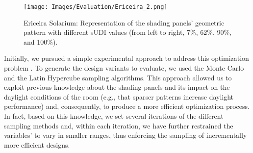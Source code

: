 
\begin{figure}[htpb]
	\centering
	\texttt{[image: Images/Evaluation/Ericeira\_2.png]}
	\caption{Ericeira Solarium: Representation of the shading panels’ geometric pattern with different sUDI values (from left to right, 7\%, 62\%, 90\%, and 100\%).}
	\label{fig:ericeira_multiple_panels}
\end{figure}

Initially, we pursued a simple experimental approach to address this optimization problem \cite{Caetano2018}. To generate the design variants to evaluate, we used the Monte Carlo and the Latin Hypercube sampling algorithms. This approach allowed us to exploit previous knowledge about the shading panels and its impact on the daylight conditions of the room (e.g., that sparser patterns increase daylight performance) and, consequently, to produce a more efficient optimization process. In fact, based on this knowledge, we set several iterations of the different sampling methods and, within each iteration, we have further restrained the variables' to vary in smaller ranges, thus enforcing the sampling of incrementally more efficient designs. %


